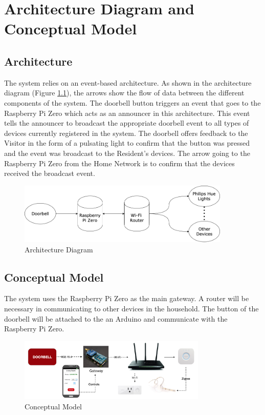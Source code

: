\chapter{Architecture Diagram and Conceptual Model}

\section{Architecture}
The system relies on an event-based architecture. As shown in the architecture diagram (Figure \ref{fig:architecture}), the arrows show the flow of data between the different components of the system. The doorbell button triggers an event that goes to the Raspberry Pi Zero which acts as an announcer in this architecture. This event tells the announcer to broadcast the appropriate doorbell event to all types of devices currently registered in the system. The doorbell offers feedback to the Visitor in the form of a pulsating light to confirm that the button was pressed and the event was broadcast to the Resident's devices. The arrow going to the Raspberry Pi Zero from the Home Network is to confirm that the devices received the broadcast event.

\begin{figure}[ht]
  \includegraphics[width=0.9\textwidth]{Architecture-updated.png}
  \centering
  \caption{Architecture Diagram}
  \label{fig:architecture}
\end{figure}

\section{Conceptual Model}
The system uses the Raspberry Pi Zero as the main gateway. A router will be necessary in communicating to other devices in the household. The button of the doorbell will be attached to the an Arduino and communicate with the Raspberry Pi Zero.

\begin{figure}[ht]
  \includegraphics[width=0.8\textwidth]{senior-design-model.png}
  \centering
  \caption{Conceptual Model}
  \label{fig:conceptualmodel}
\end{figure}